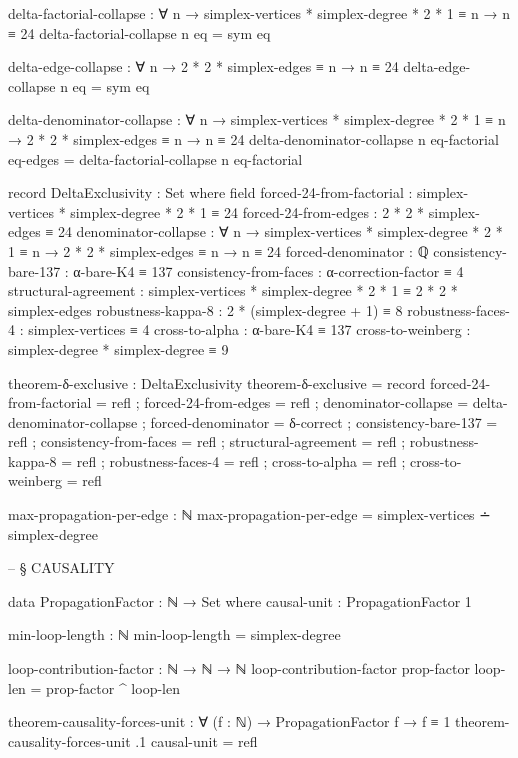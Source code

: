 \documentclass[11pt,a4paper]{book}
\begin{document}
\begin{code}
delta-factorial-collapse : ∀ n → simplex-vertices * simplex-degree * 2 * 1 ≡ n → n ≡ 24
delta-factorial-collapse n eq = sym eq

delta-edge-collapse : ∀ n → 2 * 2 * simplex-edges ≡ n → n ≡ 24
delta-edge-collapse n eq = sym eq

delta-denominator-collapse : ∀ n
  → simplex-vertices * simplex-degree * 2 * 1 ≡ n
  → 2 * 2 * simplex-edges ≡ n
  → n ≡ 24
delta-denominator-collapse n eq-factorial eq-edges = delta-factorial-collapse n eq-factorial

record DeltaExclusivity : Set where
  field
    forced-24-from-factorial   : simplex-vertices * simplex-degree * 2 * 1 ≡ 24
    forced-24-from-edges       : 2 * 2 * simplex-edges ≡ 24
    denominator-collapse       : ∀ n
                               → simplex-vertices * simplex-degree * 2 * 1 ≡ n
                               → 2 * 2 * simplex-edges ≡ n
                               → n ≡ 24
    forced-denominator         : ℚ
    consistency-bare-137       : α-bare-K4 ≡ 137
    consistency-from-faces     : α-correction-factor ≡ 4
    structural-agreement       : simplex-vertices * simplex-degree * 2 * 1 ≡ 2 * 2 * simplex-edges
    robustness-kappa-8         : 2 * (simplex-degree + 1) ≡ 8
    robustness-faces-4         : simplex-vertices ≡ 4
    cross-to-alpha             : α-bare-K4 ≡ 137
    cross-to-weinberg          : simplex-degree * simplex-degree ≡ 9

theorem-δ-exclusive : DeltaExclusivity
theorem-δ-exclusive = record
  { forced-24-from-factorial = refl
  ; forced-24-from-edges = refl
  ; denominator-collapse = delta-denominator-collapse
  ; forced-denominator = δ-correct
  ; consistency-bare-137 = refl
  ; consistency-from-faces = refl
  ; structural-agreement = refl
  ; robustness-kappa-8 = refl
  ; robustness-faces-4 = refl
  ; cross-to-alpha = refl
  ; cross-to-weinberg = refl
  }

max-propagation-per-edge : ℕ
max-propagation-per-edge = simplex-vertices ∸ simplex-degree


-- § CAUSALITY

data PropagationFactor : ℕ → Set where
  causal-unit : PropagationFactor 1

min-loop-length : ℕ
min-loop-length = simplex-degree

loop-contribution-factor : ℕ → ℕ → ℕ
loop-contribution-factor prop-factor loop-len = prop-factor ^ loop-len

theorem-causality-forces-unit : ∀ (f : ℕ) → 
  PropagationFactor f → f ≡ 1
theorem-causality-forces-unit .1 causal-unit = refl


\end{code}
\end{document}
